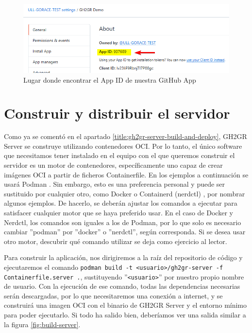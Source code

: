 \begin{figure}
    \centering
    \includegraphics[width=0.75\linewidth]{images/gh-app-id.png}
    \caption{Lugar donde encontrar el App ID de nuestra GitHub App}
    \label{fig:gh-app-id}
\end{figure}

\section{Construir y distribuir el servidor}
Como ya se comentó en el apartado \ref{title:gh2gr-server-build-and-deploy}, GH2GR Server se construye utilizando contenedores OCI. Por lo tanto, el único software que necesitamos tener instalado en el equipo con el que queremos construir el servidor es un motor de contenedores, específicamente uno capaz de crear imágenes OCI a partir de ficheros Containerfile. En los ejemplos a continuación se usará Podman \cite{podmanWhatPodman}. Sin embargo, esto es una preferencia personal y puede ser sustituido por cualquier otro, como Docker \cite{dockerDockerEngine} o Containerd (nerdctl) \cite{githubGitHubContainerdnerdctl}, por nombrar algunos ejemplos. De hacerlo, se deberán ajustar los comandos a ejecutar para satisfacer cualquier motor que se haya preferido usar. En el caso de Docker y Nerdctl, los comandos son iguales a los de Podman, por lo que solo es necesario cambiar ''podman'' por ''docker'' o ''nerdctl'', según corresponda. Si se desea usar otro motor, descubrir qué comando utilizar se deja como ejercicio al lector.

\begin{sloppypar}
Para construir la aplicación, nos dirigiremos a la raíz del repositorio de código y ejecutaremos el comando \texttt{podman build -t <usuario>/gh2gr-server -f Containerfile.server .}, sustituyendo ''{\tt <usuario>}'' por nuestro propio nombre de usuario. Con la ejecución de ese comando, todas las dependencias necesarias serán descargadas, por lo que necesitaremos una conexión a internet, y se construirá una imagen OCI con el binario de GH2GR Server y el entorno mínimo para poder ejecutarlo. Si todo ha salido bien, deberíamos ver una salida similar a la figura \ref{fig:build-server}.
\end{sloppypar}

